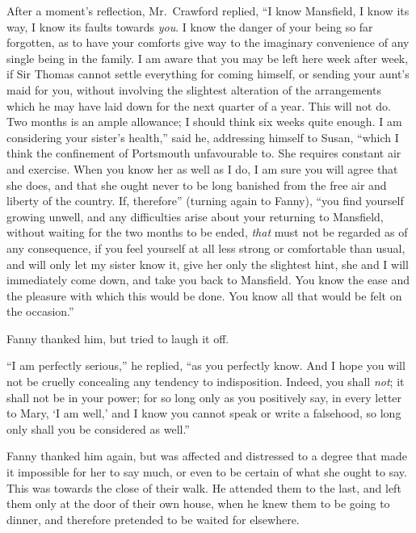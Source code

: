\documentclass{article}
\begin{document}
After a moment's reflection, Mr.\ Crawford replied,
``I know Mansfield, I know its way, I know its faults
towards \emph{you}.  I know the danger of your being so
far forgotten, as to have your comforts give way to the
imaginary convenience of any single being in the family.
I am aware that you may be left here week after week,
if Sir Thomas cannot settle everything for coming himself,
or sending your aunt's maid for you, without involving
the slightest alteration of the arrangements which he
may have laid down for the next quarter of a year.
This will not do.  Two months is an ample allowance;
I should think six weeks quite enough.  I am considering
your sister's health,'' said he, addressing himself to Susan,
``which I think the confinement of Portsmouth unfavourable to.
She requires constant air and exercise.  When you know her
as well as I do, I am sure you will agree that she does,
and that she ought never to be long banished from the free air
and liberty of the country.  If, therefore'' (turning again
to Fanny), ``you find yourself growing unwell, and any
difficulties arise about your returning to Mansfield,
without waiting for the two months to be ended,
\emph{that} must not be regarded as of any consequence,
if you feel yourself at all less strong or comfortable
than usual, and will only let my sister know it, give her
only the slightest hint, she and I will immediately
come down, and take you back to Mansfield.  You know
the ease and the pleasure with which this would be done.
You know all that would be felt on the occasion.''

Fanny thanked him, but tried to laugh it off.

``I am perfectly serious,'' he replied, ``as you perfectly know.
And I hope you will not be cruelly concealing any
tendency to indisposition.  Indeed, you shall \emph{not};
it shall not be in your power; for so long only as you
positively say, in every letter to Mary, `I am well,'
and I know you cannot speak or write a falsehood, so long
only shall you be considered as well.''

Fanny thanked him again, but was affected and distressed
to a degree that made it impossible for her to say much,
or even to be certain of what she ought to say.
This was towards the close of their walk.  He attended
them to the last, and left them only at the door of their
own house, when he knew them to be going to dinner,
and therefore pretended to be waited for elsewhere.
\end{document}
